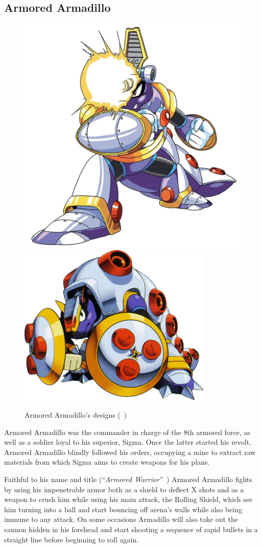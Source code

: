 \subsection{Armored Armadillo}\label{boss:Armored_Armadillo}
\begin{figure}[htp]
	\centering
	\includegraphics[width=0.3\linewidth]{figures/X1/Armored_armadillo/Armored_armadillo.jpg}
	\includegraphics[width=0.4\linewidth]{figures/X1/Armored_armadillo/MHXArmoredArmadillo.png}
	\caption{Armored Armadillo's designs (~\cite{book:MMX_Complete_art})}
\end{figure}
Armored Armadillo was the commander in charge of the 8th armored force, as well as a soldier loyal to his superior, Sigma. Once the latter started his revolt, Armored Armadillo blindly followed his orders, occupying a mine to extract raw materials from which Sigma aims to create weapons for his plans.

Faithful to his name and title (``\textit{Armored Warrior}''~\cite{book:MMX_Complete_art}) Armored Armadillo fights by using his impenetrable armor both as a shield to deflect X shots and as a weapon to crush him while using his main attack, the Rolling Shield, which see him turning into a ball and start bouncing off arena's walls while also being immune to any attack. On some occasions Armadillo will also take out the cannon hidden in his forehead and start shooting a sequence of rapid bullets in a straight line before beginning to roll again. 


